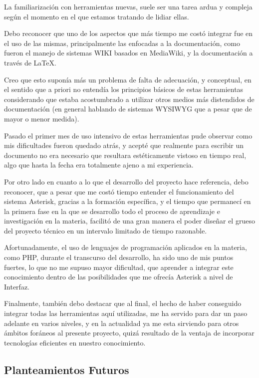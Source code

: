La familiarización con herramientas nuevas, suele ser una tarea ardua y compleja según el momento en el que estamos tratando de lidiar ellas.

Debo reconocer que uno de los aspectos que más tiempo me costó integrar fue en el uso de las mismas, principalmente las enfocadas a la documentación, como fueron el manejo de sistemas WIKI basados en MediaWiki, y la documentación a través de \LaTeX. 

Creo que esto suponía más un problema de falta de adecuación, y conceptual, en el sentido que a priori no entendía los principios básicos de estas herramientas considerando que estaba acostumbrado a utilizar otros medios más distendidos de documentación (en general hablando de sistemas WYSIWYG que a pesar que de mayor o menor medida).

Pasado el primer mes de uso intensivo de estas herramientas pude observar como mis dificultades fueron quedado atrás, y acepté que realmente para escribir un documento no era necesario que resultara estéticamente vistoso en tiempo real, algo que hasta la fecha era totalmente ajeno a mi experiencia.

Por otro lado en cuanto a lo que el desarrollo del proyecto hace referencia, debo reconocer, que a pesar que me costó tiempo entender el funcionamiento del sistema Asterisk, gracias a la formación específica, y el tiempo que permanecí en la primera fase en la que se desarrollo todo el proceso de aprendizaje e investigación en la materia, facilitó de una gran manera el poder diseñar el grueso del proyecto técnico en un intervalo limitado de tiempo razonable.

Afortunadamente, el uso de lenguajes de programación aplicados en la materia, como PHP, durante el transcurso del desarrollo, ha sido uno de mis puntos fuertes, lo que no me supuso mayor dificultad, que aprender a integrar este conocimiento dentro de las posibilidades que me ofrecía Asterisk a nivel de Interfaz.

Finalmente, también debo destacar que al final, el hecho de haber conseguido integrar todas las herramientas aquí utilizadas, me ha servido para dar un paso adelante en varios niveles, y en la actualidad ya me esta sirviendo para otros ámbitos foráneos al presente proyecto, quizá resultado de la ventaja de incorporar tecnologías eficientes en nuestro conocimiento.

\subsection{Planteamientos Futuros}

